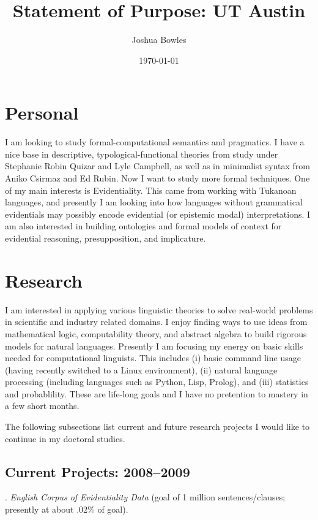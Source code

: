 \documentclass[11pt]{article}
\begin{document}
\author{Joshua Bowles}
\title{Statement of Purpose: UT Austin}
\date{\today}



\maketitle
\section{Personal}
I am looking to study formal-computational semantics and pragmatics. I have a nice base in descriptive, typological-functional theories from study under Stephanie Robin Quizar and Lyle Campbell, as well as in minimalist syntax from Aniko Csirmaz and Ed Rubin. Now I want to study more formal techniques. One of my main interests is Evidentiality. This came from working with Tukanoan languages, and presently I am looking into how languages without grammatical evidentials may possibly encode evidential (or epistemic modal) interpretations. I am also interested in building ontologies and formal models of context for evidential reasoning, presupposition, and implicature. 

\section{Research}
I am interested in applying various linguistic theories to solve real-world problems in scientific and industry related domains. I enjoy finding ways to use ideas from mathematical logic, computability theory, and abstract algebra to build rigorous models for natural languages. Presently I am focusing my energy on basic skills needed for computational linguists. This includes (i) basic command line usage (having recently switched to a Linux environment), (ii) natural language processing (including languages such as Python, Lisp, Prolog), and (iii) statistics and probablility. These are life-long goals and I have no pretention to mastery in a few short months.   

The following subsections list current and future research projects I would like to continue in my doctoral studies. 

\subsection{Current Projects: 2008--2009}
\ex. \textsl{English Corpus of Evidentiality Data} (goal of 1 million sentences/clauses; presently at about .02\% of goal).
\end{document}

